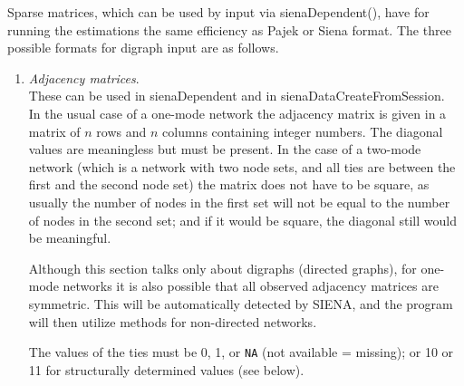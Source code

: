 \documentclass[a4paper,fleqn,11pt]{article}
\newcommand{\+}{\, + \,}
\newcommand{\sfn}[1]{\textsf{#1}}
\newcommand{\si}{{\sf SIENA}}
\newcommand{\sn}{{\sf StOCNET}}
\begin{document}
Sparse matrices, which can be used by input via
\sfn{sienaDependent()}, have for running the estimations
the same efficiency as Pajek or Siena format.
The three possible formats for digraph input are as follows.
\begin{enumerate}
\item \emph{Adjacency matrices}.\\
      These can be used in  \sfn{sienaDependent} and in
      \sfn{sienaDataCreateFromSession}.\\
      In the usual case of a one-mode network the adjacency matrix
      is given in a matrix of $n$ rows and $n$ columns
      containing integer numbers.
      The diagonal values are meaningless but must be present.
      In the case of a two-mode network (which is a network with two
      node sets, and all ties are between the first and the second node set)
      the matrix does not have to be
      square, as usually the number of nodes in the first set will not be
      equal to the number of nodes in the second set;
      and if it would be square, the diagonal still would be meaningful.

      Although this section talks only about digraphs (directed graphs),
      for one-mode networks it is
      also possible that all observed adjacency matrices are symmetric.
      This will be automatically detected by \si, and
      the program will then utilize methods for non-directed networks.

      The values of the ties must be 0, 1, or \texttt{NA}
      (not available = missing);
      or 10 or 11 for structurally determined values (see below).


\end{enumerate}
\end{document}

